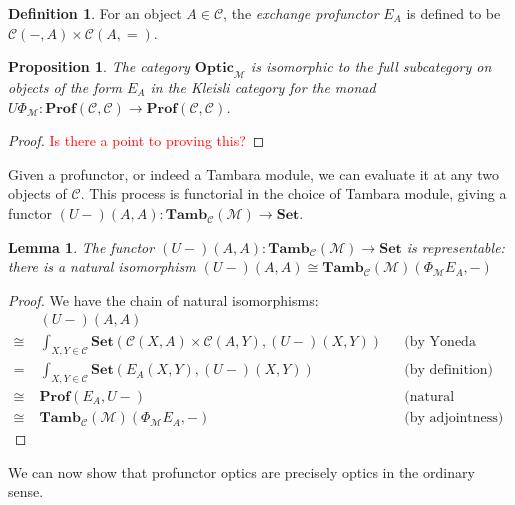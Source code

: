 \documentclass[11pt,a4paper]{article}
\theoremstyle{plain}
\newtheorem{proposition}[theorem]{Proposition}
\newtheorem{lemma}[theorem]{Lemma}
\theoremstyle{definition}
\newtheorem{definition}[theorem]{Definition}
\newcommand{\C}{\mathscr{C}}
\newcommand{\M}{\mathscr{M}}
\newcommand{\Pastro}{\Phi}
\newcommand{\Set}{\mathbf{Set}}
\newcommand{\Prof}{\mathbf{Prof}}
\newcommand{\Optic}{\mathbf{Optic}}
\newcommand{\Tamb}{\mathbf{Tamb}}
\newcommand{\todo}[1]{\textcolor{red}{\small #1}}
\begin{document}
\begin{definition}
For an object $A \in \C$, the \emph{exchange profunctor} $E_A$ is defined to be $\C(-, A) \times \C(A, {=})$.
\end{definition}

\begin{proposition}
The category $\Optic_\M$ is isomorphic to the full subcategory on objects of the form $E_A$ in the Kleisli category for the monad $U \Pastro_\M : \Prof(\C, \C) \to \Prof(\C, \C)$.
\end{proposition}
\begin{proof}
\todo{Is there a point to proving this?}
\end{proof}

Given a profunctor, or indeed a Tambara module, we can evaluate it at any two objects of $\C$. This process is functorial in the choice of Tambara module, giving a functor $(U-)(A,A) : \Tamb_\C(\M) \to \Set$.

\begin{lemma}
\label{lemma-rep}
The functor $(U-)(A,A) : \Tamb_\C(\M) \to \Set$ is representable: there is a natural isomorphism
$(U-)(A,A) \cong \Tamb_\C(\M)(\Pastro_\M E_A, -)$
\end{lemma}
\begin{proof}
We have the chain of natural isomorphisms:
\begin{align*}
&(U-)(A,A) \\
\cong \;&\int_{X,Y \in \C} \Set(\C(X,A) \times \C(A,Y), (U-)(X,Y)) && \text{(by Yoneda (un)reduction twice)} \\
=\;&\int_{X,Y \in \C} \Set(E_A(X,Y), (U-)(X,Y)) && \text{(by definition)}\\
\cong \;&\Prof(E_A, U-) && \text{(natural transformations as ends)} \\
\cong \;&\Tamb_\C(\M)(\Pastro_\M E_A, -) && \text{(by adjointness)} 
\end{align*}
\end{proof}

We can now show that profunctor optics are precisely optics in the ordinary sense.
\end{document}
